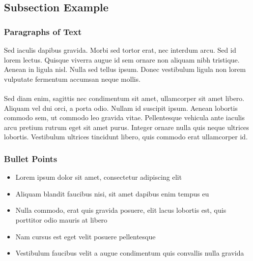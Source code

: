 \documentclass{beamer}
\begin{document}
\subsection{Subsection Example} %

\begin{frame}
\frametitle{Paragraphs of Text}
Sed iaculis dapibus gravida. Morbi sed tortor erat, nec interdum arcu. Sed id lorem lectus. Quisque viverra augue id sem ornare non aliquam nibh tristique. Aenean in ligula nisl. Nulla sed tellus ipsum. Donec vestibulum ligula non lorem vulputate fermentum accumsan neque mollis.\\~\\

Sed diam enim, sagittis nec condimentum sit amet, ullamcorper sit amet libero. Aliquam vel dui orci, a porta odio. Nullam id suscipit ipsum. Aenean lobortis commodo sem, ut commodo leo gravida vitae. Pellentesque vehicula ante iaculis arcu pretium rutrum eget sit amet purus. Integer ornare nulla quis neque ultrices lobortis. Vestibulum ultrices tincidunt libero, quis commodo erat ullamcorper id.
\end{frame}


\begin{frame}
\frametitle{Bullet Points}
\begin{itemize}
\item Lorem ipsum dolor sit amet, consectetur adipiscing elit
\item Aliquam blandit faucibus nisi, sit amet dapibus enim tempus eu
\item Nulla commodo, erat quis gravida posuere, elit lacus lobortis est, quis porttitor odio mauris at libero
\item Nam cursus est eget velit posuere pellentesque
\item Vestibulum faucibus velit a augue condimentum quis convallis nulla gravida
\end{itemize}
\end{frame}

\end{document}
